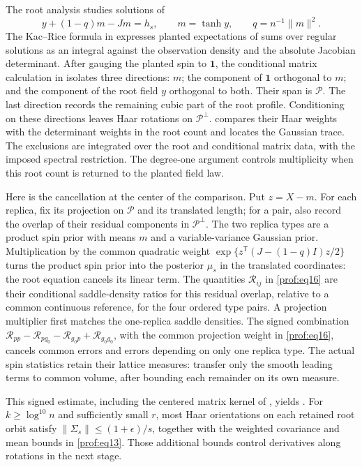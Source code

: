 The root analysis studies solutions of
\[
 y+(1-q)m-Jm=h_s,\qquad m=\tanh y,\qquad q=n^{-1}\|m\|^2.
\]
The Kac--Rice formula in  expresses planted expectations
of sums over regular solutions as an integral against the observation
density and the absolute Jacobian determinant. After gauging the planted
spin to $\mathbf1$, the
conditional matrix calculation in  isolates three
directions: $m$; the component of $\mathbf1$ orthogonal to $m$; and the
component of the root field $y$ orthogonal to both. Their span is
$\mathcal P$. The last direction records the remaining cubic part of the
root profile. Conditioning on these directions leaves Haar rotations on
$\mathcal P^\perp$.  compares their Haar weights with
the determinant weights in the root count and locates the Gaussian trace.
The exclusions are integrated over the root and conditional matrix data,
with the imposed spectral restriction. The degree-one argument controls
multiplicity when this root count is returned to the planted field law.

Here is the cancellation at the center of the comparison. Put $z=X-m$.
For each replica, fix its projection on $\mathcal P$ and its translated
length; for a pair, also record the overlap of their residual components
in $\mathcal P^\perp$. The two replica types are a product spin prior
with means $m$ and a variable-variance Gaussian prior. Multiplication
by the common quadratic weight
$\exp\{z^{\mathsf T}(J-(1-q)I)z/2\}$ turns the product spin prior
into the posterior $\mu_s$ in the translated coordinates: the root
equation cancels its linear term. The quantities
$\mathcal R_{ij}$ in \eqref{prof:eq16} are their conditional saddle-density
ratios for this residual overlap, relative to a common continuous
reference, for the four ordered type pairs. A projection multiplier first
matches the one-replica saddle densities. The signed combination
$\mathcal R_{pp}-\mathcal R_{pg_0}-\mathcal R_{g_0p}
+\mathcal R_{g_0g_0}$, with the common projection weight in
\eqref{prof:eq16}, cancels common errors and errors depending on only one
replica type. The actual spin statistics retain their lattice measures:
 transfer
only the smooth leading terms to common volume, after bounding each
remainder on its own measure.

This signed estimate, including the centered matrix kernel of
, yields
. For $k\ge\log^{10}n$ and sufficiently small
$r$, most Haar orientations on each retained root orbit satisfy
$\|\Sigma_s\|\le(1+\epsilon)/s$,
together with the weighted covariance and mean bounds in
\eqref{prof:eq13}. Those additional bounds control derivatives along
rotations in the next stage.


